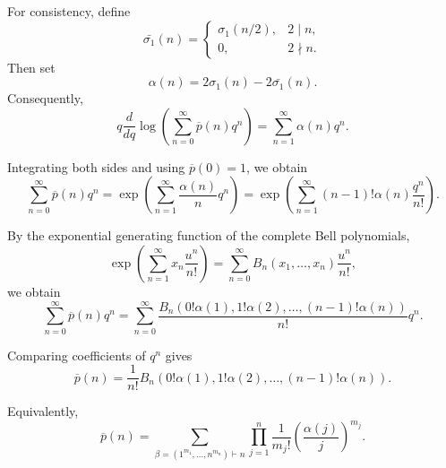 \documentclass[12pt,oneside,reqno]{amsart}
\numberwithin{equation}{section}
\begin{document}
	For consistency, define
	\[
	\bar{\sigma_1}(n)
	=
	\begin{cases}
		\sigma_1(n/2), & 2\mid n,\\
		0, & 2\nmid n.
	\end{cases}
	\]
	Then set
	\[
	\alpha(n)
	=
	2\sigma_1(n)-2\bar{\sigma_1}(n).
	\]
	Consequently,
	\[
	q\frac{d}{dq}
	\log
	\left(
	\sum_{n=0}^{\infty}
	\overline{p}(n)q^n
	\right)
	=
	\sum_{n=1}^{\infty}\alpha(n)q^n.
	\]
	
	Integrating both sides and using
	$\overline{p}(0)=1$, we obtain
	\[
	\sum_{n=0}^{\infty}\overline{p}(n)q^n
	=
	\exp\left(
	\sum_{n=1}^{\infty}\frac{\alpha(n)}{n}q^n
	\right)
	=
	\exp\left(
	\sum_{n=1}^{\infty}
	(n-1)!\alpha(n)\frac{q^n}{n!}
	\right).
	\]
	
	By the exponential generating function of the complete Bell
	polynomials,
	\[
	\exp\left(
	\sum_{n=1}^{\infty}x_n\frac{u^n}{n!}
	\right)
	=
	\sum_{n=0}^{\infty}
	B_n(x_1,\ldots,x_n)\frac{u^n}{n!},
	\]
	we obtain
	\[
	\sum_{n=0}^{\infty}\overline{p}(n)q^n
	=
	\sum_{n=0}^{\infty}
	\frac{
		B_n\left(
		0!\alpha(1),1!\alpha(2),\ldots,(n-1)!\alpha(n)
		\right)
	}{n!}q^n.
	\]
	
	Comparing coefficients of $q^n$ gives
	\[
	\overline{p}(n)
	=
	\frac{1}{n!}
	B_n\left(
	0!\alpha(1),1!\alpha(2),\ldots,(n-1)!\alpha(n)
	\right).
	\]
	
	Equivalently,
	\[
	\overline{p}(n)
	=
	\sum_{\beta=(1^{m_1},\ldots,n^{m_n})\vdash n}
	\prod_{j=1}^{n}
	\frac{1}{m_j!}
	\left(
	\frac{\alpha(j)}{j}
	\right)^{m_j}.
	\]
	
\end{document}
